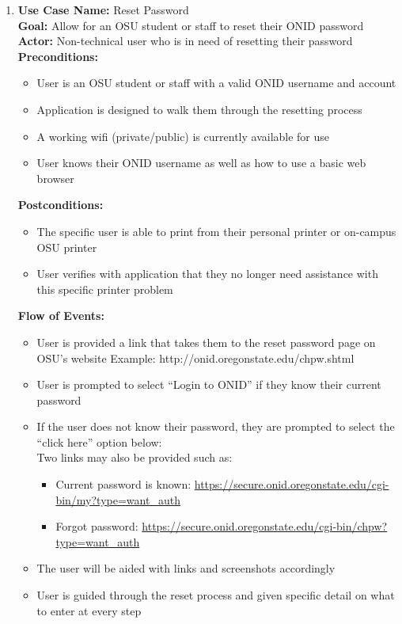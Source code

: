 \documentclass[12pt, letterpaper]{article}
\begin{document}
\begin{enumerate}
	\item \textbf{Use Case Name:} Reset Password
\\\textbf{Goal:} Allow for an OSU student or staff to reset their ONID password
\\\textbf{Actor:} Non-technical user who is in need of resetting their password
\\\textbf{Preconditions:}
\begin{itemize}
	\item User is an OSU student or staff with a valid ONID username and account
	\item Application is designed to walk them through the resetting process
	\item A working wifi (private/public) is currently available for use 
	\item User knows their ONID username as well as how to use a basic web browser
\end{itemize}
\textbf{Postconditions:}
\begin{itemize}
	\item The specific user is able to print from their personal printer or on-campus OSU printer
	\item User verifies with application that they no longer need assistance with this specific printer problem
\end{itemize}
\textbf{Flow of Events:}
\begin{itemize}
	\item User is provided a link that takes them to the reset password page on OSU’s website
	Example: http://onid.oregonstate.edu/chpw.shtml
	\item User is prompted to select “Login to ONID” if they know their current password 
	\item If the user does not know their password, they are prompted to select the “click here” option below:
	\\Two links may also be provided such as:
	\begin{itemize}
	\item Current password is known:
	\url{https://secure.onid.oregonstate.edu/cgi-bin/my?type=want_auth}
	\item Forgot password:
	\url{https://secure.onid.oregonstate.edu/cgi-bin/chpw?type=want_auth}
	\end{itemize}
	\item The user will be aided with links and screenshots accordingly
	\item User is guided through the reset process and given specific detail on what to enter at every step

\end{itemize}
\end{enumerate}
\end{document}
